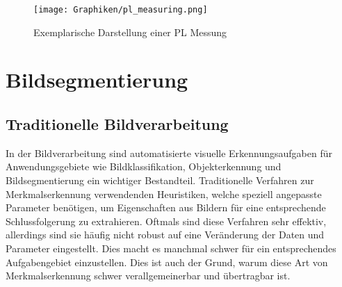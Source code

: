   \begin{figure}[h!]
     \centering
     \texttt{[image: Graphiken/pl\_measuring.png]}
     \caption{Exemplarische Darstellung einer PL Messung}
     \label{fig:measurement}
  \end{figure}


 
  \iffalse
  \begin{figure}[h!]
    \begin{subfigure}[b]{0.6\textwidth}
         \centering
         \texttt{[image: Graphiken/MeasurementScheme.png]}
         \caption{}
         \label{fig:measurement1}
     \end{subfigure}
     \begin{subfigure}[b]{0.5\textwidth}
         \centering
         \texttt{[image: Graphiken/pl\_imaging\_device.png]}
         \caption{}
         \label{fig:measurement2}
     \end{subfigure}
    \caption{Aufbau Photolumineszenz Messverfahren \textbf{(a)}, Messgerät \textbf{(b)}}
    \label{fig:measurementScheme}
  \end{figure}
  \fi 
  
  
 

\section{Bildsegmentierung}

\subsection{Traditionelle Bildverarbeitung}

In der Bildverarbeitung sind automatisierte visuelle Erkennungsaufgaben für Anwendungsgebiete wie Bildklassifikation, Objekterkennung und Bildsegmentierung ein wichtiger Bestandteil. Traditionelle Verfahren zur Merkmalserkennung verwendenden Heuristiken, welche speziell angepasste Parameter benötigen, um Eigenschaften aus Bildern für eine entsprechende Schlussfolgerung zu extrahieren. Oftmals sind diese Verfahren sehr effektiv, allerdings sind sie häufig nicht robust auf eine Veränderung der Daten und Parameter eingestellt. Dies macht es manchmal schwer für ein entsprechendes Aufgabengebiet einzustellen. Dies ist auch der Grund, warum diese Art von Merkmalserkennung schwer verallgemeinerbar und übertragbar ist. 


